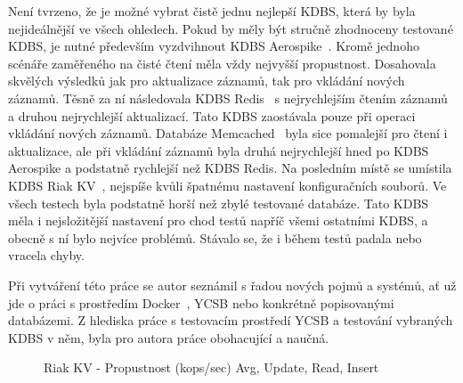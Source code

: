 \documentclass[czech,master,dept460,male,csharp,cpdeclaration]{diploma}
\begin{document}
	Není tvrzeno, že je možné vybrat čistě jednu nejlepší KDBS, která by byla nejideálnější ve všech ohledech. Pokud by měly být stručně zhodnoceny testované KDBS, je nutné především vyzdvihnout KDBS Aerospike~\cite{aerospike}. Kromě jednoho scénáře zaměřeného na čisté čtení měla vždy nejvyšší propustnost. Dosahovala skvělých výsledků jak pro aktualizace záznamů, tak pro vkládání nových záznamů. Těsně za ní následovala KDBS Redis~\cite{redis} s nejrychlejším čtením záznamů a druhou nejrychlejší aktualizací. Tato KDBS zaostávala pouze při operaci vkládání nových záznamů. Databáze Memcached~\cite{memcached} byla sice pomalejší pro čtení i aktualizace, ale při vkládání záznamů byla druhá nejrychlejší hned po KDBS Aerospike a podstatně rychlejší než KDBS Redis. Na posledním místě se umístila KDBS Riak KV~\cite{riak}, nejspíše kvůli špatnému nastavení konfiguračních souborů. Ve všech testech byla podstatně horší než zbylé testované databáze. Tato KDBS měla i nejsložitější nastavení pro chod testů napříč všemi ostatními KDBS, a obecně s ní bylo nejvíce problémů. Stávalo se, že i během testů padala nebo vracela chyby.
	
	Při vytváření této práce se autor seznámil s řadou nových pojmů a systémů, ať už jde o práci s prostředím Docker~\cite{docker}, YCSB nebo konkrétně popisovanými databázemi. Z hlediska práce s testovacím prostředí YCSB a testování vybraných KDBS v něm, byla pro autora práce obohacující a naučná.
	
		\begin{figure}
		\centering
		\caption{Riak KV - Propustnost (kops/sec) Avg, Update, Read, Insert}
		\label{graph_riak}
	\end{figure}
	
	\nocite{*}
	
	\printbibliography[title={Literatura}, heading=bibintoc]
	
\end{document}
